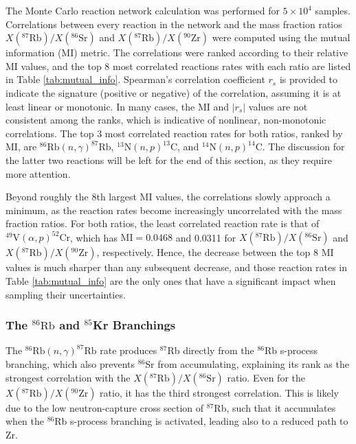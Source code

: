 The Monte Carlo reaction network calculation was performed for $5 \times 10^{4}$ samples. Correlations between every reaction in the network and the mass fraction ratios $X(^{87}\mathrm{Rb})/X(^{86}\mathrm{Sr})$ and $X(^{87}\mathrm{Rb})/X(^{90}\mathrm{Zr})$ were computed using the mutual information (MI) metric. The correlations were ranked according to their relative MI values, and the top 8 most correlated reactions rates with each ratio are listed in Table \ref{tab:mutual_info}. Spearman's correlation coefficient $r_{s}$ is provided to indicate the signature (positive or negative) of the correlation, assuming it is at least linear or monotonic. In many cases, the MI and $|r_{s}|$ values are not consistent among the ranks, which is indicative of nonlinear, non-monotonic correlations. The top 3 most correlated reaction rates for both ratios, ranked by MI, are $^{86}\mathrm{Rb}(n,\gamma)^{87}\mathrm{Rb}$, $^{13}\mathrm{N}(n,p)^{13}\mathrm{C}$, and $^{14}\mathrm{N}(n,p)^{14}\mathrm{C}$. The discussion for the latter two reactions will be left for the end of this section, as they require more attention.

Beyond roughly the 8th largest MI values, the correlations slowly approach a minimum, as the reaction rates become increasingly uncorrelated with the mass fraction ratios. For both ratios, the least correlated reaction rate is that of $^{49}\mathrm{V}(\alpha,p)^{52}\mathrm{Cr}$, which has $\mathrm{MI} = 0.0468$ and 0.0311 for $X(^{87}\mathrm{Rb})/X(^{86}\mathrm{Sr})$ and $X(^{87}\mathrm{Rb})/X(^{90}\mathrm{Zr})$, respectively. Hence, the decrease between the top 8 MI values is much sharper than any subsequent decrease, and those reaction rates in Table \ref{tab:mutual_info} are the only ones that have a significant impact when sampling their uncertainties.

\subsubsection{The $^{86}\mathrm{Rb}$ and $^{85}$Kr Branchings}

The $^{86}\mathrm{Rb}(n,\gamma)^{87}\mathrm{Rb}$ rate produces $^{87}$Rb directly from the $^{86}$Rb s-process branching, which also prevents $^{86}$Sr from accumulating, explaining its rank as the strongest correlation with the $X(^{87}\mathrm{Rb})/X(^{86}\mathrm{Sr})$ ratio. Even for the $X(^{87}\mathrm{Rb})/X(^{90}\mathrm{Zr})$ ratio, it has the third strongest correlation. This is likely due to the low neutron-capture cross section of $^{87}$Rb, such that it accumulates when the $^{86}$Rb s-process branching is activated, leading also to a reduced path to Zr.

